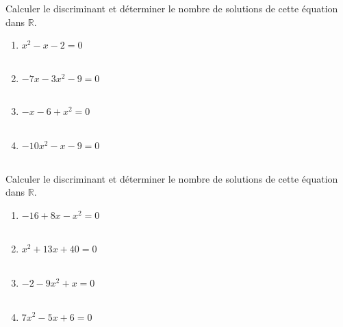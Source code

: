 \documentclass[11pt]{article}
\begin{document}
\begin{exercice}
Calculer le discriminant et déterminer le nombre de solutions de cette
équation dans $\mathbb{R}$.
\begin{multicols}{2}
  \begin{enumerate}
  \item $x^2-x-2=0$ \\ \dtf \\ \dtf
  \item $-7x-3x^2-9=0$ \\ \dtf \\ \dtf
  \item $-x-6+x^2=0$ \\ \dtf \\ \dtf
  \item $-10x^2-x-9=0$ \\ \dtf \\ \dtf
  \end{enumerate}
\end{multicols}
\end{exercice}

\begin{exercice}
Calculer le discriminant et déterminer le nombre de solutions de cette
équation dans $\mathbb{R}$.
\begin{multicols}{2}
  \begin{enumerate}
  \item $-16+8x-x^2=0$ \\ \dtf \\ \dtf
  \item $x^2+13x+40=0$ \\ \dtf \\ \dtf
  \item $-2-9x^2+x=0$ \\ \dtf \\ \dtf
  \item $7x^2-5x+6=0$ \\ \dtf \\ \dtf
  \end{enumerate}
\end{multicols}
\end{exercice}
\end{document}

